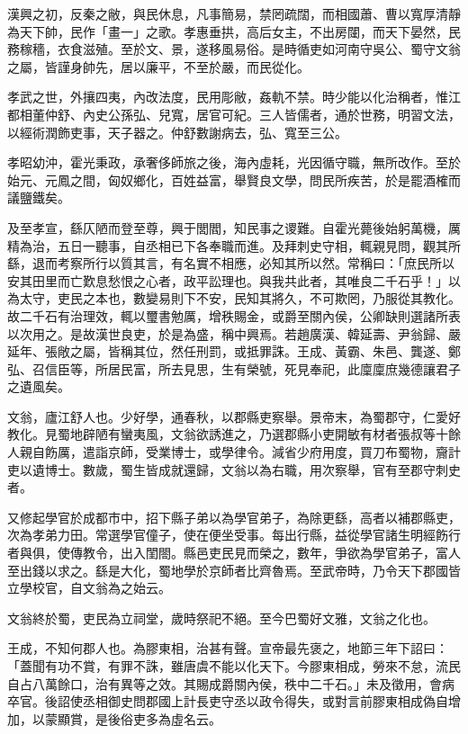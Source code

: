 
\begin{pinyinscope}
漢興之初，反秦之敝，與民休息，凡事簡易，禁罔疏闊，而相國蕭、曹以寬厚清靜為天下帥，民作「畫一」之歌。孝惠垂拱，高后女主，不出房闥，而天下晏然，民務稼穡，衣食滋殖。至於文、景，遂移風易俗。是時循吏如河南守吳公、蜀守文翁之屬，皆謹身帥先，居以廉平，不至於嚴，而民從化。

孝武之世，外攘四夷，內改法度，民用彫敝，姦軌不禁。時少能以化治稱者，惟江都相董仲舒、內史公孫弘、兒寬，居官可紀。三人皆儒者，通於世務，明習文法，以經術潤飾吏事，天子器之。仲舒數謝病去，弘、寬至三公。

孝昭幼沖，霍光秉政，承奢侈師旅之後，海內虛耗，光因循守職，無所改作。至於始元、元鳳之間，匈奴鄉化，百姓益富，舉賢良文學，問民所疾苦，於是罷酒榷而議鹽鐵矣。

及至孝宣，繇仄陋而登至尊，興于閭閻，知民事之谡難。自霍光薨後始躬萬機，厲精為治，五日一聽事，自丞相已下各奉職而進。及拜刺史守相，輒親見問，觀其所繇，退而考察所行以質其言，有名實不相應，必知其所以然。常稱曰：「庶民所以安其田里而亡歎息愁恨之心者，政平訟理也。與我共此者，其唯良二千石乎！」以為太守，吏民之本也，數變易則下不安，民知其將久，不可欺罔，乃服從其教化。故二千石有治理效，輒以璽書勉厲，增秩賜金，或爵至關內侯，公卿缺則選諸所表以次用之。是故漢世良吏，於是為盛，稱中興焉。若趙廣漢、韓延壽、尹翁歸、嚴延年、張敞之屬，皆稱其位，然任刑罰，或抵罪誅。王成、黃霸、朱邑、龔遂、鄭弘、召信臣等，所居民富，所去見思，生有榮號，死見奉祀，此廩廩庶幾德讓君子之遺風矣。

文翁，廬江舒人也。少好學，通春秋，以郡縣吏察舉。景帝末，為蜀郡守，仁愛好教化。見蜀地辟陋有蠻夷風，文翁欲誘進之，乃選郡縣小吏開敏有材者張叔等十餘人親自飭厲，遣詣京師，受業博士，或學律令。減省少府用度，買刀布蜀物，齎計吏以遺博士。數歲，蜀生皆成就還歸，文翁以為右職，用次察舉，官有至郡守刺史者。

又修起學官於成都市中，招下縣子弟以為學官弟子，為除更繇，高者以補郡縣吏，次為孝弟力田。常選學官僮子，使在便坐受事。每出行縣，益從學官諸生明經飭行者與俱，使傳教令，出入閨閤。縣邑吏民見而榮之，數年，爭欲為學官弟子，富人至出錢以求之。繇是大化，蜀地學於京師者比齊魯焉。至武帝時，乃令天下郡國皆立學校官，自文翁為之始云。

文翁終於蜀，吏民為立祠堂，歲時祭祀不絕。至今巴蜀好文雅，文翁之化也。

王成，不知何郡人也。為膠東相，治甚有聲。宣帝最先褒之，地節三年下詔曰：「蓋聞有功不賞，有罪不誅，雖唐虞不能以化天下。今膠東相成，勞來不怠，流民自占八萬餘口，治有異等之效。其賜成爵關內侯，秩中二千石。」未及徵用，會病卒官。後詔使丞相御史問郡國上計長吏守丞以政令得失，或對言前膠東相成偽自增加，以蒙顯賞，是後俗吏多為虛名云。


\end{pinyinscope}
